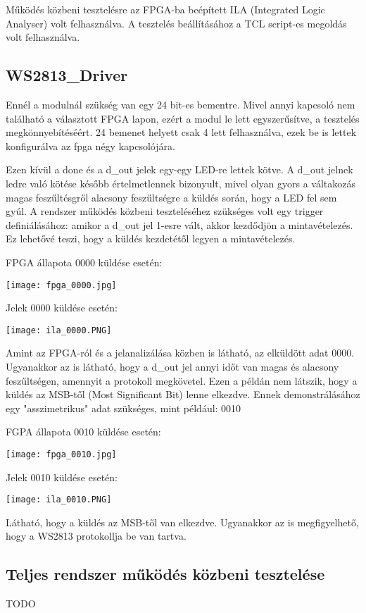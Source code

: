 \tab Működés közbeni tesztelésre az FPGA-ba beépített ILA (Integrated Logic Analyser) volt felhasználva. A tesztelés beállításához a TCL script-es megoldás\cite{brassai2018ukda_ila} volt felhasználva.

\subsection{WS2813\_Driver}

Ennél a modulnál szükség van egy 24 bit-es bementre. Mivel annyi kapcsoló nem található a választott FPGA lapon, ezért a modul le lett egyszerűsítve, a tesztelés megkönnyebítéséért. 
24 bemenet helyett csak 4 lett felhasználva, ezek be is lettek konfigurálva az fpga négy kapcsolójára.

Ezen kívül a done és a d\_out jelek egy-egy LED-re lettek kötve. A d\_out jelnek ledre való kötése később értelmetlennek bizonyult, mivel olyan gyors a váltakozás magas feszűltésgről alacsony feszűltségre
a küldés során, hogy a LED fel sem gyúl.
A rendszer működés közbeni teszteléséhez szükséges volt egy trigger definiálásához: amikor a d\_out jel 1-esre vált, akkor kezdődjön a mintavételezés. Ez lehetővé teszi, hogy a küldés kezdetétől legyen a mintavételezés.

FPGA állapota 0000 küldése esetén:

\texttt{[image: fpga\_0000.jpg]}

Jelek 0000 küldése esetén:

\texttt{[image: ila\_0000.PNG]}

Amint az FPGA-ról és a jelanalizálása közben is látható, az elküldött adat 0000. Ugyanakkor az is látható, hogy a d\_out jel annyi időt van magas és alacsony feszűltségen, amennyit a protokoll megkövetel.
Ezen a példán nem látszik, hogy a küldés az MSB-től (Most Significant Bit) lenne elkezdve. Ennek demonstrálásához egy "asszimetrikus" adat szükséges, mint például: 0010

FGPA állapota 0010 küldése esetén:

\texttt{[image: fpga\_0010.jpg]}

Jelek 0010 küldése esetén:

\texttt{[image: ila\_0010.PNG]}

Látható, hogy a küldés az MSB-től van elkezdve. Ugyanakkor az is megfigyelhető, hogy a WS2813 protokollja be van tartva.

\subsection{Teljes rendszer működés közbeni tesztelése}

TODO